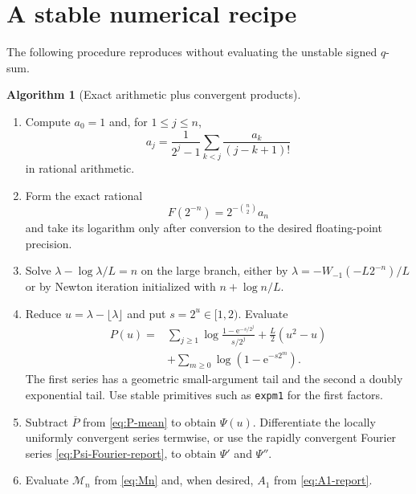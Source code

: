 \documentclass[11pt,oneside]{article}
\theoremstyle{definition}
\newtheorem{algorithm}[theorem]{Algorithm}
\theoremstyle{remark}
\newcommand{\e}{\mathrm e}
\begin{document}
\section{A stable numerical recipe}
\label{app:numerical}

The following procedure reproduces  without evaluating the unstable signed
$q$-sum.

\begin{algorithm}[Exact arithmetic plus convergent products]
\label{alg:numerics}
\leavevmode
\begin{enumerate}
\item Compute $a_0=1$ and, for $1\le j\le n$,
\begin{equation*}
 a_j=\frac1{2^j-1}\sum_{k<j}\frac{a_k}{(j-k+1)!}
\end{equation*}
in rational arithmetic.

\item Form the exact rational
\begin{equation*}
 F(2^{-n})=2^{-\binom n2}a_n
\end{equation*}
and take its logarithm only after conversion to the desired floating-point precision.

\item Solve $\lambda-\log\lambda/L=n$ on the large branch, either by
$\lambda=-W_{-1}(-L2^{-n})/L$ or by Newton iteration initialized with
$n+\log n/L$.

\item Reduce $u=\lambda-\lfloor\lambda\rfloor$ and put $s=2^u\in[1,2)$.  Evaluate
\begin{align*}
 P(u)={}&\sum_{j\ge1}\log\frac{1-\e^{-s/2^j}}{s/2^j}
 +\frac L2(u^2-u)\\
 &+\sum_{m\ge0}\log(1-\e^{-s2^m}).
\end{align*}
The first series has a geometric small-argument tail and the second a doubly exponential tail.
Use stable primitives such as \texttt{expm1} for the first factors.

\item Subtract $\overline P$ from \eqref{eq:P-mean} to obtain $\Psi(u)$.  Differentiate the
locally uniformly convergent series termwise, or use the rapidly convergent Fourier series
\eqref{eq:Psi-Fourier-report}, to obtain $\Psi'$ and $\Psi''$.

\item Evaluate $\mathcal M_n$ from \eqref{eq:Mn} and, when desired, $A_1$ from
\eqref{eq:A1-report}.
\end{enumerate}
\end{algorithm}
\end{document}

